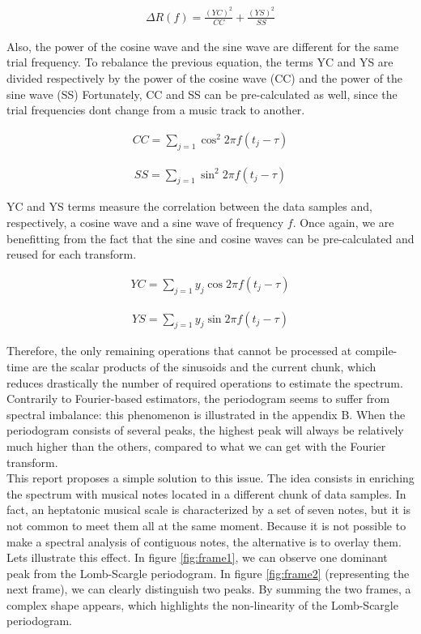 \documentclass[letterpaper]{article}
\begin{document}
\begin{align}
\Delta R(f) = \frac{(YC)^{2}}{CC} 
+ \frac{(YS)^{2}}{SS}
\label{fig:ccss}
\end{align}

Also, the power of the cosine wave and the sine wave are different for the same trial frequency. To rebalance the previous equation, the terms YC and YS
are divided respectively by the power of the cosine wave (CC) and the power of the sine wave (SS)
Fortunately, CC and SS can be pre-calculated as well, since the trial frequencies don\textquotesingle t change from a music track to another.

\begin{align}
CC = \sum\limits_{j=1} \cos^{2} 2\pi f (t_{j} - \tau)
\label{fig:cc}
\end{align}

\begin{align}
SS = \sum\limits_{j=1} \sin^{2} 2\pi f (t_{j} - \tau)
\label{fig:ss}
\end{align}

YC and YS terms measure the correlation between the data samples and, respectively, a cosine wave and a sine wave of frequency $f$. Once again, we are
benefitting from the fact that the sine and cosine waves can be pre-calculated and reused for each transform.

\begin{align}
YC = \sum\limits_{j=1} y_{j}\cos 2\pi f (t_{j} - \tau)
\end{align}

\begin{align}
YS = \sum\limits_{j=1} y_{j}\sin 2\pi f (t_{j} - \tau)
\end{align}

Therefore, the only remaining operations that cannot be processed at compile-time are the scalar products of the sinusoids and the current chunk, which
reduces drastically the number of required operations to estimate the spectrum.\\

Contrarily to Fourier-based
estimators, the periodogram seems to suffer from spectral imbalance: this phenomenon is illustrated in the appendix B. When the periodogram consists of several peaks, the highest peak will always be relatively much higher than the others, compared to what we can get with the Fourier transform.\\

This report proposes a simple solution to this issue. The idea consists in enriching the spectrum with musical notes located in a different chunk of data samples. In fact, an heptatonic musical scale is characterized by a set of seven notes, but it is
not common to meet them all at the same moment. Because it is not possible to make a spectral analysis of contiguous notes, the alternative is to overlay them.
Let\textquotesingle s illustrate this effect. In figure \ref{fig:frame1}, 
we can observe one dominant peak from the Lomb-Scargle periodogram. In figure \ref{fig:frame2} (representing the next frame), we can clearly distinguish two peaks. By summing the two frames, a complex shape appears, which highlights the non-linearity of the Lomb-Scargle periodogram.\\
\end{document}
